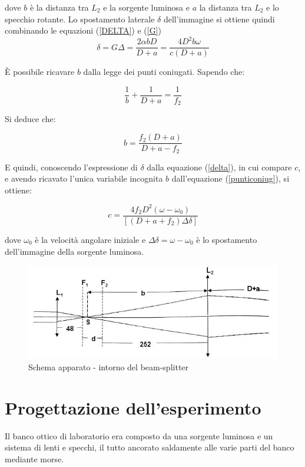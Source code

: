 \documentclass{article}
\begin{document}
dove $b$ è la distanza tra $L_2$ e la sorgente luminosa e $a$  la distanza tra $L_2$ e lo specchio rotante. Lo spostamento laterale $\delta$ dell'immagine si ottiene quindi
combinando le equazioni (\ref{DELTA}) e (\ref{G})
\begin{equation}
\delta = G\Delta =\frac{2\alpha b D}{D + a}=\frac{4 D^2 b \omega}{c(D+a)}
\label{delta}
\end{equation}

È possibile ricavare $b$ dalla legge dei punti coniugati. Sapendo che:

\begin{equation}
\frac{1}{b}+\frac{1}{D+a}=\frac{1}{f_2}
\label{punticoniug}
\end{equation}

Si deduce che:

\begin{equation}
b=\frac{f_2(D+a)}{D+a-f_2}
\end{equation}

E quindi, conoscendo l'espressione di $\delta$ dalla equazione (\ref{delta}), in cui compare $c$, e avendo ricavato l'unica variabile incognita $b$ dall'equazione
(\ref{punticoniug}), si ottiene:

\begin{equation}
c = \frac{4f_2D^2(\omega-\omega_0)}{[(D+a+f_2)\Delta\delta]}
\end{equation}

dove $\omega_0$ è la velocità angolare iniziale e $\Delta\delta = \omega - \omega_0$ è lo spostamento dell'immagine della sorgente luminosa.

\begin{figure}[h]
    \centering
        \includegraphics[width=\linewidth]{IntroTeorica1.JPG}
    \caption{Schema apparato - intorno del beam-splitter}
\end{figure}


\section{Progettazione dell'esperimento}
Il banco ottico di laboratorio era composto da una sorgente luminosa e un sistema di lenti e specchi, il tutto ancorato saldamente alle varie parti del banco mediante 
morse.
\end{document}
